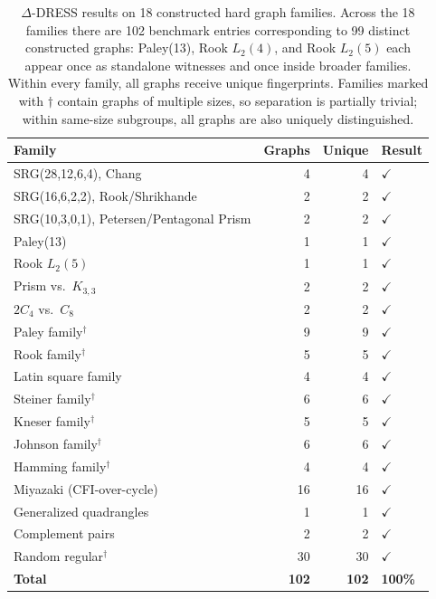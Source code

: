 \documentclass[11pt,a4paper]{article}
\begin{document}
\begin{table}[t]
\centering
\caption{$\Delta$-DRESS results on 18 constructed hard graph families.
Across the 18 families there are 102 benchmark entries corresponding to 99 distinct constructed graphs: Paley(13), Rook $L_2(4)$, and Rook $L_2(5)$ each appear once as standalone witnesses and once inside broader families.
Within every family, all graphs receive unique fingerprints.
Families marked with $\dagger$ contain graphs of multiple sizes, so separation is partially trivial; within same-size subgroups, all graphs are also uniquely distinguished.}
\label{tab:constructed-results}
\begin{tabular}{@{}lrrl@{}}
\toprule
Family & Graphs & Unique & Result \\
\midrule
SRG(28,12,6,4), Chang          &  4 &  4 & $\checkmark$ \\
SRG(16,6,2,2), Rook/Shrikhande &  2 &  2 & $\checkmark$ \\
SRG(10,3,0,1), Petersen/Pentagonal Prism &  2 &  2 & $\checkmark$ \\
Paley(13)                          &  1 &  1 & $\checkmark$ \\
Rook $L_2(5)$                      &  1 &  1 & $\checkmark$ \\
Prism vs.\ $K_{3,3}$              &  2 &  2 & $\checkmark$ \\
$2C_4$ vs.\ $C_8$                 &  2 &  2 & $\checkmark$ \\
Paley family$^\dagger$            &  9 &  9 & $\checkmark$ \\
Rook family$^\dagger$             &  5 &  5 & $\checkmark$ \\
Latin square family                &  4 &  4 & $\checkmark$ \\
Steiner family$^\dagger$          &  6 &  6 & $\checkmark$ \\
Kneser family$^\dagger$           &  5 &  5 & $\checkmark$ \\
Johnson family$^\dagger$          &  6 &  6 & $\checkmark$ \\
Hamming family$^\dagger$          &  4 &  4 & $\checkmark$ \\
Miyazaki (CFI-over-cycle)         & 16 & 16 & $\checkmark$ \\
Generalized quadrangles            &  1 &  1 & $\checkmark$ \\
Complement pairs                   &  2 &  2 & $\checkmark$ \\
Random regular$^\dagger$          & 30 & 30 & $\checkmark$ \\
\midrule
\textbf{Total}                     & \textbf{102} & \textbf{102} & \textbf{100\%} \\
\bottomrule
\end{tabular}
\end{table}
\end{document}
